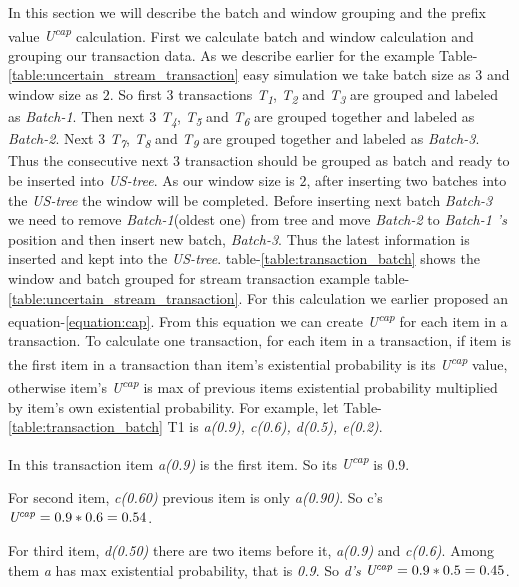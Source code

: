 \documentclass[conference]{IEEEtran}
\begin{document}
 
    In this section we will describe the batch and window grouping and the prefix value \emph{U\textsuperscript{cap}} calculation. First we calculate batch and window calculation and grouping our transaction data. As we describe earlier for the example Table-\ref{table:uncertain_stream_transaction} easy simulation we take batch size as \emph{$3$} and window size as \emph{$2$}. So first \emph{$3$} transactions \emph{T\textsubscript{1}}, \emph{T\textsubscript{2}} and \emph{T\textsubscript{3}} are grouped and labeled as \emph{Batch-1}. Then next \emph{$3$} \emph{T\textsubscript{4}}, \emph{T\textsubscript{5}} and \emph{T\textsubscript{6}} are grouped together and labeled as \emph{Batch-2}. Next \emph{$3$} \emph{T\textsubscript{7}}, \emph{T\textsubscript{8}} and \emph{T\textsubscript{9}} are grouped together and labeled as \emph{Batch-3}. Thus the consecutive next \emph{$3$} transaction should be grouped as batch and ready to be inserted into \emph{US-tree}. As our window size is $2$, after inserting two batches into the \emph{US-tree} the window will be completed. Before inserting next batch \emph{Batch-3} we need to remove \emph{Batch-1}(oldest one) from tree and move \emph{Batch-2} to \emph{Batch-1 's} position and then insert new batch, \emph{Batch-3}. Thus the latest information is inserted and kept into the \emph{US-tree}. table-\ref{table:transaction_batch} shows the window and batch grouped for stream transaction example table-\ref{table:uncertain_stream_transaction}.
    For this calculation we earlier proposed an equation-\ref{equation:cap}. From this equation we can create \emph{U\textsuperscript{cap}} for each item in a transaction. To calculate one transaction, for each item in a transaction, if item is the first item in a transaction than item's existential probability is its \emph{U\textsuperscript{cap}} value, otherwise item's \emph{U\textsuperscript{cap}} is max of previous items existential probability multiplied by item's  own existential probability. For example, let Table-\ref{table:transaction_batch} T1 is \emph{a(0.9), c(0.6), d(0.5), e(0.2)}. 
  
In this transaction item \emph{a(0.9)} is the first item. So its \emph{U\textsuperscript{cap}} is 0.9.

For second item, \emph{c(0.60)} previous item is only \emph{a(0.90)}. So c's $\emph{U\textsuperscript{cap}} = 0.9*0.6 = 0.54$.

For third item, \emph{d(0.50)} there are two items before it, \emph{a(0.9)} and \emph{c(0.6)}. Among them \emph{a} has max existential probability, that is \emph{0.9}. So \emph{d's } $\emph{U\textsuperscript{cap}} = 0.9*0.5 = 0.45$.
\end{document}
